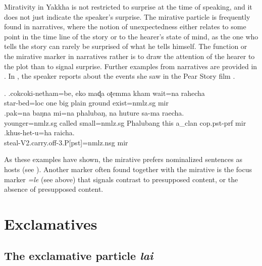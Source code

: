  
Mirativity in Yakkha is not restricted to surprise at the time of speaking, and it does not just indicate the speaker's surprise. The mirative particle is frequently found in narratives, where the notion of unexpectedness either relates to some point in the time line of the story or to the hearer's state of mind, as the one who tells the story can rarely be surprised of what he tells himself. The function or the mirative marker in narratives rather is to draw the attention of the hearer to the plot than to signal surprise.  Further examples from narratives are provided in \Next. In \Next[c], the speaker reports about  the events she saw in the Pear Story film \citep{Chafe1980The-Pear}. 
 
 
 \ex. \ag.cokcoki-netham=be,       eko maɖa oʈemma kham  wait=na        rahecha\\
 star-bed{\sc =loc} one big plain ground exist{\sc [3sg;npst]=nmlz.sg} {\sc mir}\\
 \bg.pak=na  baŋna mi=na  phalubaŋ, na   huture    sa-ma      raecha.\\
 younger{\sc =nmlz.sg} called small{\sc =nmlz.sg} Phalubang this a\_clan {\sc cop.pst-prf} {\sc mir}\\
 \bg.khus-het-u=ha  raicha.\\
	steal{\sc -V2.carry.off-3.P[pst]=nmlz.nsg} {\sc mir}\\
 
 As these  examples have shown, the mirative prefers nominalized sentences as hosts (see ). Another marker often found together with the mirative is the focus marker \emph{=le} (see above) that signals contrast to presupposed content, or the absence of presupposed content.

 
\section{Exclamatives}\label{ptcl-excla}

\subsection{The exclamative particle \emph{lai}}
 
